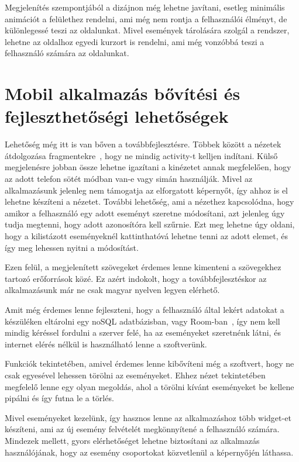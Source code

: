 \documentclass[
]{thesis-ekf}
\theoremstyle{definition}
\theoremstyle{remark}
\begin{document}
	Megjelenítés szempontjából a dizájnon még lehetne javítani, esetleg minimális animációt a felülethez rendelni, ami még nem rontja a felhasználói élményt, de különlegessé teszi az oldalunkat. Mivel események tárolására szolgál a rendszer, lehetne az oldalhoz egyedi kurzort is rendelni, ami még vonzóbbá teszi a felhasználó számára az oldalunkat. 
	
	
	\section{Mobil alkalmazás bővítési és fejleszthetőségi lehetőségek}
	Lehetőség még itt is van bőven a továbbfejlesztésre. Többek között a nézetek átdolgozása fragmentekre~\cite{android_fragment}, hogy ne mindig activity-t kelljen indítani. Külső megjelenésre jobban össze lehetne igazítani a kinézetet annak megfelelően, hogy az adott telefon sötét módban van-e vagy simán használják. Mivel az alkalmazásunk jelenleg nem támogatja az elforgatott képernyőt, így ahhoz is el lehetne készíteni a nézetet. További lehetőség, ami a nézethez kapcsolódna, hogy amikor a felhasználó egy adott eseményt szeretne módosítani, azt jelenleg úgy tudja megtenni, hogy adott azonosítóra kell szűrnie. Ezt meg lehetne úgy oldani, hogy a kilistázott eseményeknél kattinthatóvá lehetne tenni az adott elemet, és így meg lehessen nyitni a módosítást. 
	
	Ezen felül, a megjelenített szövegeket érdemes lenne kimenteni a szövegekhez tartozó erőforrások közé. Ez azért indokolt, hogy a továbbfejlesztéskor az alkalmazásunk már ne csak magyar nyelven legyen elérhető. 
	
	Amit még érdemes lenne fejleszteni, hogy a felhasználó által lekért adatokat a készüléken eltárolni egy noSQL adatbázisban, vagy Room-ban~\cite{android_room}, így nem kell mindig kéréssel fordulni a szerver felé, ha az eseményeket szeretnénk látni, és internet elérés nélkül is használható lenne a szoftverünk. 
	
	Funkciók tekintetében, amivel érdemes lenne kibővíteni még a szoftvert, hogy ne csak egyesével lehessen törölni az eseményeket. Ehhez nézet tekintetében megfelelő lenne egy olyan megoldás, ahol a törölni kívánt eseményeket be kellene pipálni és így futna le a törlés. 
	
	Mivel eseményeket kezelünk, így hasznos lenne az alkalmazáshoz több widget-et készíteni, ami az új esemény felvételét megkönnyítené a felhasználó számára. Mindezek mellett, gyors elérhetőséget lehetne biztosítani az alkalmazás használójának, hogy az esemény csoportokat közvetlenül a képernyőjén láthassa. 
	
\end{document}
